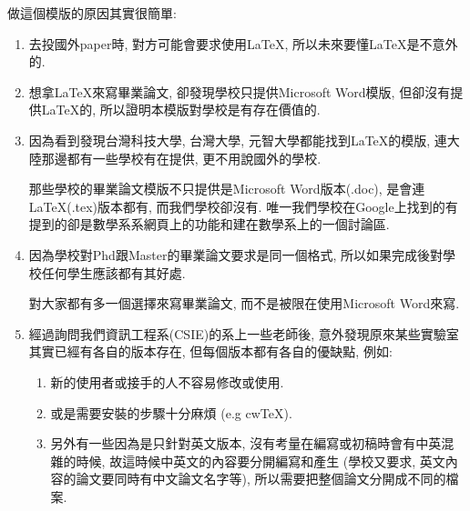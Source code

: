 

做這個模版的原因其實很簡單:

\begin{enumerate}
  \item
  {
    去投國外paper時, 對方可能會要求使用LaTeX, 所以未來要懂LaTeX是不意外的.
  } %

  \item
  {
    想拿LaTeX來寫畢業論文, 卻發現學校只提供Microsoft Word模版, 但卻沒有提供LaTeX的, 所以證明本模版對學校是有存在價值的.
  } %

  \item
  {
    因為看到發現台灣科技大學, 台灣大學, 元智大學都能找到LaTeX的模版, 連大陸那邊都有一些學校有在提供, 更不用說國外的學校.

    那些學校的畢業論文模版不只提供是Microsoft Word版本(.doc), 是會連LaTeX(.tex)版本都有, 而我們學校卻沒有. 唯一我們學校在Google上找到的有提到的卻是數學系系網頁上的功能和建在數學系上的一個討論區.
  } %

  \item
  {
    因為學校對Phd跟Master的畢業論文要求是同一個格式, 所以如果完成後對學校任何學生應該都有其好處.

    對大家都有多一個選擇來寫畢業論文, 而不是被限在使用Microsoft Word來寫.
  } %

  \item
  {
    經過詢問我們資訊工程系(CSIE)的系上一些老師後, 意外發現原來某些實驗室其實已經有各自的版本存在, 但每個版本都有各自的優缺點, 例如:

    \begin{enumerate}

      \item
      {
        新的使用者或接手的人不容易修改或使用.
      } %

      \item
      {
        或是需要安裝的步驟十分麻煩 (e.g cwTeX).
      } %

      \item
      {
        另外有一些因為是只針對英文版本, 沒有考量在編寫或初稿時會有中英混雜的時候, 故這時候中英文的內容要分開編寫和產生 (學校又要求, 英文內容的論文要同時有中文論文名字等), 所以需要把整個論文分開成不同的檔案.
      } %
    \end{enumerate}
  } %
\end{enumerate}


